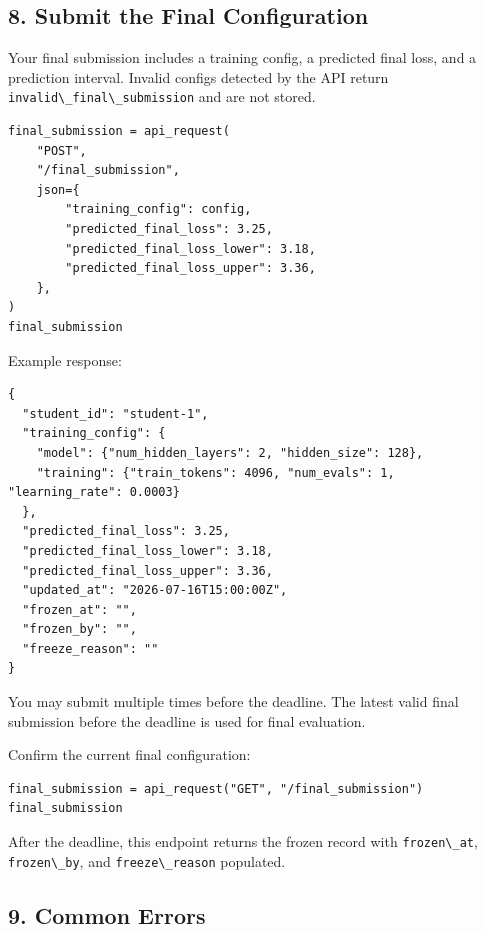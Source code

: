 \documentclass[
]{article}
\newcommand{\passthrough}[1]{#1}
\begin{document}
\hypertarget{submit-the-final-configuration}{%
\subsection{8. Submit the Final
Configuration}\label{submit-the-final-configuration}}

Your final submission includes a training config, a predicted final
loss, and a prediction interval. Invalid configs detected by the API
return \passthrough{\lstinline!invalid\_final\_submission!} and are not
stored.

\begin{verbatim}
final_submission = api_request(
    "POST",
    "/final_submission",
    json={
        "training_config": config,
        "predicted_final_loss": 3.25,
        "predicted_final_loss_lower": 3.18,
        "predicted_final_loss_upper": 3.36,
    },
)
final_submission
\end{verbatim}

Example response:

\begin{verbatim}
{
  "student_id": "student-1",
  "training_config": {
    "model": {"num_hidden_layers": 2, "hidden_size": 128},
    "training": {"train_tokens": 4096, "num_evals": 1, "learning_rate": 0.0003}
  },
  "predicted_final_loss": 3.25,
  "predicted_final_loss_lower": 3.18,
  "predicted_final_loss_upper": 3.36,
  "updated_at": "2026-07-16T15:00:00Z",
  "frozen_at": "",
  "frozen_by": "",
  "freeze_reason": ""
}
\end{verbatim}

You may submit multiple times before the deadline. The latest valid
final submission before the deadline is used for final evaluation.

Confirm the current final configuration:

\begin{verbatim}
final_submission = api_request("GET", "/final_submission")
final_submission
\end{verbatim}

After the deadline, this endpoint returns the frozen record with
\passthrough{\lstinline!frozen\_at!},
\passthrough{\lstinline!frozen\_by!}, and
\passthrough{\lstinline!freeze\_reason!} populated.

\hypertarget{common-errors}{%
\subsection{9. Common Errors}\label{common-errors}}
\end{document}
